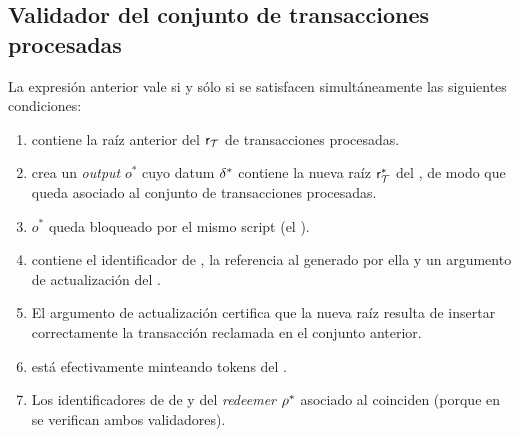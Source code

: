 \subsection{Validador del conjunto de transacciones procesadas}
\label{subsec:validadores-y-flujo-transaccional-validador-del-conjunto-de-transacciones-procesadas}

\begin{center}
\SpendValidatorNotation{\TxsUpdaterMintingValidator}
\end{center}

La expresión anterior vale si y sólo si se satisfacen simultáneamente las siguientes condiciones:

\begin{enumerate}[noitemsep]
  \item \datum contiene la raíz anterior del \SMT $\mathsf{r}_{\mathcal{T}}$ de transacciones procesadas.
  \item \tx crea un \textit{output} $o^*$ cuyo datum $\delta^*$ contiene la nueva raíz $\mathsf{r}_{\mathcal{T}}^*$ del \SMT, de modo que queda asociado al conjunto de transacciones procesadas.
  \item $o^*$ queda bloqueado por el mismo script (el \TxsUpdaterMintingValidator).
  \item \redeemer contiene el identificador de \LockTx, la referencia al \UTxO generado por ella y un argumento \ZK de actualización del \SMT.
  \item El argumento \ZK de actualización certifica que la nueva raíz resulta de insertar correctamente la transacción reclamada en el conjunto anterior.
  \item \tx está efectivamente minteando tokens del \zkBridge.
  \item Los identificadores de \LockTx de \redeemer y del \textit{redeemer} $\rho^*$ asociado al \MintingValidator coinciden (porque en \MintTx se verifican ambos validadores).
\end{enumerate}
